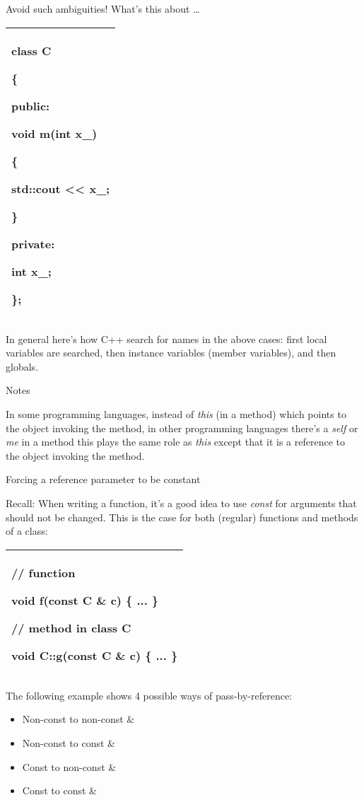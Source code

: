\documentclass[
]{article}
\providecommand{\tightlist}{%
  \setlength{\itemsep}{0pt}\setlength{\parskip}{0pt}}
\begin{document}
Avoid such ambiguities! What's this about \ldots{}

\begin{longtable}[]{@{}l@{}}
\toprule
\endhead
\begin{minipage}[t]{0.97\columnwidth}\raggedright
class C

\{

public:

void m(int x\_)

\{

std::cout \textless\textless{} x\_;

\}

private:

int x\_;

\};\strut
\end{minipage}\tabularnewline
\bottomrule
\end{longtable}

In general here's how C++ search for names in the above cases: first
local variables are searched, then instance variables (member
variables), and then globals.

Notes

In some programming languages, instead of \emph{this} (in a method)
which points to the object invoking the method, in other programming
languages there's a \emph{self} or \emph{me} in a method this plays the
same role as \emph{this} except that it is a reference to the object
invoking the method.

Forcing a reference parameter to be constant

Recall: When writing a function, it's a good idea to use \emph{const}
for arguments that should not be changed. This is the case for both
(regular) functions and methods of a class:

\begin{longtable}[]{@{}l@{}}
\toprule
\endhead
\begin{minipage}[t]{0.97\columnwidth}\raggedright
// function

void f(\textbf{const} C \& c) \{ ... \}

// method in class C

void C::g(\textbf{const} C \& c) \{ ... \}\strut
\end{minipage}\tabularnewline
\bottomrule
\end{longtable}

The following example shows 4 possible ways of pass-by-reference:

\begin{itemize}
\tightlist
\item
  Non-const to non-const \&
\item
  Non-const to const \&
\item
  Const to non-const \&
\item
  Const to const \&
\end{itemize}
\end{document}
